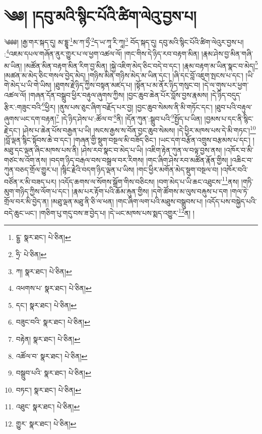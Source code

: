 \setcounter{footnote}{0} 
\chapter{༄༅། །དབུ་མའི་སྙིང་པོའི་ཚིག་ལེའུ་བྱས་པ།}༄༅༅། །རྒྱ་གར་སྐད་དུ། མ་དྷྱཱ་\footnote{ངྷྱ་  སྣར་ཐང་།  པེ་ཅིན། }མ་ཀ་ཧྲྀ་\footnote{ཧྲི་  པེ་ཅིན། }ད་ཡ་ཀཱ་རི་ཀཱ།\footnote{ཀ།  སྣར་ཐང་།  པེ་ཅིན། } བོད་སྐད་དུ། དབུ་མའི་སྙིང་པོའི་ཚིག་ལེའུར་བྱས་པ། :\footnote{འཕགས་པ་  སྣར་ཐང་།  པེ་ཅིན། }འཇམ་དཔལ་གཞོན་ནུར་གྱུར་པ་ལ་ཕྱག་འཚལ་ལོ། །གང་གིས་དེ་ཉིད་རབ་བརྟག་མིན། །རྣམ་ཤེས་བྱ་མིན་གཞི་མ་ཡིན། །མཚོན་མིན་བརྟག་མིན་རིག་བྱ་མིན། །སྐྱེ་འཇིག་མེད་ཅིང་བདེ་བ་དང་། །རྣམ་བརྟག་མ་ཡིན་སྣང་བ་མེད།\footnote{དང་།  སྣར་ཐང་།  པེ་ཅིན། } །མཚན་མ་མེད་ཅིང་གསལ་བྱེད་མེད། །གཉིས་མིན་གཉིས་མེད་མ་ཡིན་དང་། །ཞི་དང་བློ་འཇུག་སྤངས་པ་དང་། །ཡི་གེ་མེད་པ་ཡི་གེ་ཡིས། །ཐུགས་རྗེ་ཉིད་ཀྱིས་བསྟན་མཛད་པ། །སྟོན་པ་མ་ནོར་ཉིད་གསུང་བ། །དེ་ལ་གུས་པར་ཕྱག་འཚལ་ལོ། །གཞན་དོན་བསྒྲུབ་ཕྱིར་བརྟུལ་ཞུགས་ཀྱིས། །བྱང་ཆུབ་ཆེན་པོར་བློས་བྱས་རྣམས། །དེ་ཉིད་བདུད་རྩིར་:གཟུང་བའི་\footnote{བཟུང་བའི་  སྣར་ཐང་།  པེ་ཅིན། }ཕྱིར། །ནུས་པས་ཅུང་ཞིག་བརྗོད་པར་བྱ། །བྱང་ཆུབ་སེམས་ནི་མི་གཏོང་དང་། །ཐུབ་པའི་བརྟུལ་ཞུགས་ཡང་དག་བརྟན།\footnote{བརྟེན།  སྣར་ཐང་།  པེ་ཅིན། } །དེ་ཉིད་ཤེས་པ་:ཚོལ་བ་\footnote{འཚོལ་བ་  སྣར་ཐང་།  པེ་ཅིན། }ནི། །དོན་ཀུན་:སྒྲུབ་པའི་\footnote{བསྒྲུབ་པའི་  སྣར་ཐང་།  པེ་ཅིན། }སྤྱོད་པ་ཡིན། །བྱམས་པ་དང་ནི་སྙིང་རྗེ་དང་། །ཤེས་པ་ཆེན་པོས་བརྒྱན་པ་ཡི། །སངས་རྒྱས་ས་བོན་བྱང་ཆུབ་སེམས། །དེ་ཕྱིར་མཁས་པས་དེ་མི་གཏང་།\footnote{བཏང་།  སྣར་ཐང་།  པེ་ཅིན། } །བློ་ལྡན་སྙིང་སྟོབས་ཆེ་བ་དང་། །གཞན་གྱི་སྡུག་བསྔལ་མི་བཟོད་ཅིང་། །ཡང་དག་བརྩོན་འགྲུས་བརྩམས་པ་དང་། །མཐུ་དང་ལྡན་ཞིང་མཁས་པས་ནི། །ཤེས་རབ་སྣང་བ་མེད་པ་ཡི། །འཇིག་རྟེན་ཀུན་ལ་བལྟ་བྱས་ནས། །འཁོར་བ་མི་གཙང་ས་འོག་ནས། །བདག་ཉིད་བརྒལ་བས་བསྒྲལ་བར་རིགས། །གང་ཞིག་ཤེས་རབ་མཚོན་རྣོན་གྱིས། །འཆིང་བ་ཀུན་བཅད་གྲོལ་གྱུར་པ། །སྙིང་རྗེའི་བདག་ཉིད་ལྡན་པ་ཡིས། །གང་ཕྱིར་མགོན་མེད་སྡུག་བསྔལ་བ། །འཁོར་བའི་བཙོན་ར་མི་བཟད་པར། །འདོད་ཆགས་ལ་སོགས་སྒྲོག་གིས་བཅིངས། །བག་མེད་པ་ཡི་ཆང་འཐུངས་\footnote{འཐུང་  སྣར་ཐང་།  པེ་ཅིན། }ནས། །གཏི་མུག་གཉིད་ཀྱིས་ལོག་པ་དང་། །རྣམ་པར་རྟོག་པའི་ཆོམ་རྐུན་གྱིས། །དགེ་ཚོགས་མ་ལུས་བརྐུས་པ་དག །གལ་ཏེ་གྲོལ་བར་མི་བྱེད་ན། །མཐུ་ལྡན་མཐུ་ནི་ཅི་ལ་ཕན། །གང་ཞིག་ལག་པའི་མཐུས་བསྒྲུབས་པ། །འདོད་པས་བསྐྱེད་པའི་བདེ་ཆུང་ཡང་། །གཅིག་པུ་གདུ་བས་ཟ་བྱེད་པ། །དེ་ཡང་མཁས་པས་སྨད་འགྱུར་\footnote{གྱུར་  སྣར་ཐང་།  པེ་ཅིན། }ན། །
